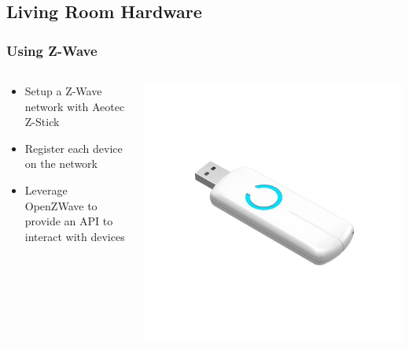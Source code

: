 \documentclass[aspectratio=169,11pt,hyperref={colorlinks=true}]{beamer}
\begin{document}
\subsection{Living Room Hardware}
\begin{frame}
    \frametitle{Using Z-Wave}
    \begin{columns}[T]
        \begin{column}{.48\textwidth}
            \begin{itemize}
                \item Setup a Z-Wave network with Aeotec Z-Stick
                \item Register each device on the network
                \item Leverage OpenZWave to provide an API to interact with
                    devices
            \end{itemize}
        \end{column}
        \begin{column}{.48\textwidth}
            \includegraphics[width=.8\textwidth]{aeotec-zstick.jpg}
        \end{column}
    \end{columns}
\end{frame}
\end{document}
